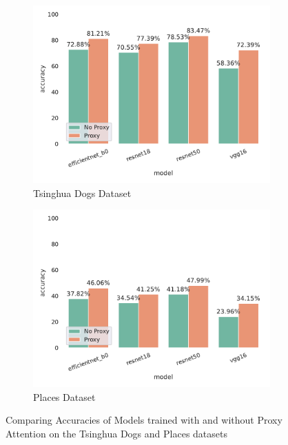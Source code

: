 \documentclass[a4paper,11pt,openright]{book}
\begin{document}
\begin{figure}[!htb]
    \begin{subfigure}[h]{.5\textwidth}
        \includegraphics[width=\linewidth, right]{results/tsing_results.pdf}
        \caption{Tsinghua Dogs Dataset}
    \end{subfigure}
    \begin{subfigure}[h]{.5\textwidth}
        \includegraphics[width=\linewidth, left]{results/places256_results.pdf}
        \caption{Places Dataset}
    \end{subfigure}
    \caption{Comparing Accuracies of Models trained with and without Proxy Attention on the Tsinghua Dogs and Places datasets}
    \label{fig:tsing_places256_results}
\end{figure}
\end{document}
